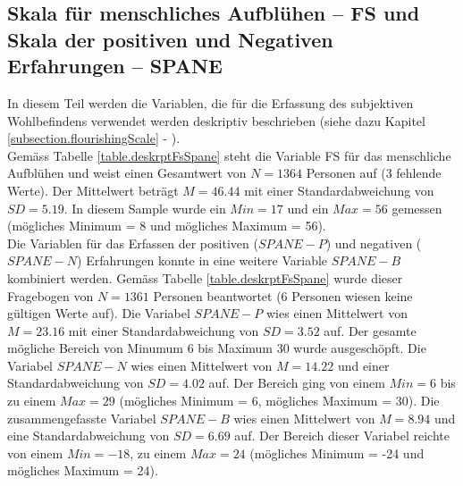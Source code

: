 \subsection{Skala für menschliches Aufblühen -- FS und Skala der positiven und Negativen Erfahrungen -- SPANE}
In diesem Teil werden die Variablen, die für die Erfassung des subjektiven Wohlbefindens verwendet werden deskriptiv beschrieben (siehe dazu Kapitel \ref{subsection.flourishingScale} - ).\\
Gemäss Tabelle \ref{table.deskrptFsSpane} steht die Variable FS für das menschliche Aufblühen und weist einen Gesamtwert von $N = 1364$ Personen auf (3 fehlende Werte). Der Mittelwert beträgt $M = 46.44$ mit einer Standardabweichung von $SD = 5.19$. In diesem Sample wurde ein $Min = 17$ und ein $Max = 56$ gemessen (mögliches Minimum = 8 und mögliches Maximum = 56).\\
Die Variablen für das Erfassen der positiven ($SPANE-P$) und negativen ($SPANE-N$) Erfahrungen konnte in eine weitere Variable $SPANE-B$ kombiniert werden. Gemäss Tabelle \ref{table.deskrptFsSpane} wurde dieser Fragebogen von $N = 1361$ Personen beantwortet (6 Personen wiesen keine gültigen Werte auf). Die Variabel $SPANE-P$ wies einen Mittelwert von $M = 23.16$ mit einer Standardabweichung von $SD = 3.52$ auf. Der gesamte mögliche Bereich von Minumum 6 bis Maximum 30 wurde ausgeschöpft. Die Variabel $SPANE-N$ wies einen Mittelwert von $M=14.22$ und einer Standardabweichung von $SD=4.02$ auf. Der Bereich ging von einem $Min = 6$ bis zu einem $Max = 29$ (mögliches Minimum = 6, mögliches Maximum = 30). Die zusammengefasste Variabel $SPANE-B$ wies einen Mittelwert von $M = 8.94$ und eine Standardabweichung von $SD = 6.69$ auf. Der Bereich dieser Variabel reichte von einem $Min = -18$, zu einem $Max = 24$ (mögliches Minimum = -24 und mögliches Maximum = 24).
